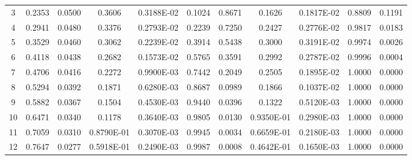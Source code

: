 \documentclass[
twocolumn,
aps,prd,
nofootinbib,
superscriptaddress,
showpacs,ligh
tightenlines, 
]{revtex4}
\begin{document}
\begin{widetext}
\begin{table}[h]
\begin{center}
\begin{tabular}{|c|c|c|c|c|c|c|c|c|c|c|}
      3                 &        0.2353             &        0.0500             &     0.3606                 &     0.3188E-02             &        0.1024             &        0.8671             & 0.1626 & 0.1817E-02 & 0.8809 & 0.1191 \\
      4                 &        0.2941             &        0.0480             &     0.3376                 &     0.2793E-02             &        0.2239             &        0.7250             & 0.2427 & 0.2776E-02 & 0.9817 & 0.0183 \\
      5                 &        0.3529             &        0.0460             &     0.3062                 &     0.2239E-02             &        0.3914             &        0.5438             & 0.3000 & 0.3191E-02 & 0.9974 & 0.0026 \\
      6                 &        0.4118             &        0.0438             &     0.2682                 &     0.1573E-02             &        0.5765             &        0.3591             & 0.2992 & 0.2787E-02 & 0.9996 & 0.0004 \\
      7                &        0.4706             &        0.0416             &     0.2272                 &     0.9900E-03             &        0.7442             &        0.2049             & 0.2505 & 0.1895E-02 & 1.0000 & 0.0000 \\
      8                &        0.5294             &        0.0392             &     0.1871                 &     0.6280E-03             &        0.8687             &        0.0989             & 0.1866 & 0.1037E-02 & 1.0000 & 0.0000 \\
      9               &        0.5882             &        0.0367             &     0.1504                 &     0.4530E-03             &        0.9440             &        0.0396             & 0.1322 & 0.5120E-03 & 1.0000 & 0.0000 \\
      10                 &        0.6471             &        0.0340             &     0.1178                 &     0.3640E-03             &        0.9805             &        0.0130             & 0.9350E-01 & 0.2980E-03 & 1.0000 & 0.0000 \\
      11                &        0.7059             &        0.0310             &     0.8790E-01             &     0.3070E-03             &        0.9945             &        0.0034             & 0.6659E-01 & 0.2180E-03 & 1.0000 & 0.0000 \\
      12                 &        0.7647             &        0.0277             &     0.5918E-01             &     0.2490E-03             &        0.9987             &        0.0008             & 0.4642E-01 & 0.1650E-03 & 1.0000 & 0.0000 \\

\end{tabular}
\end{center}
\end{table}
\end{widetext}
\end{document}
